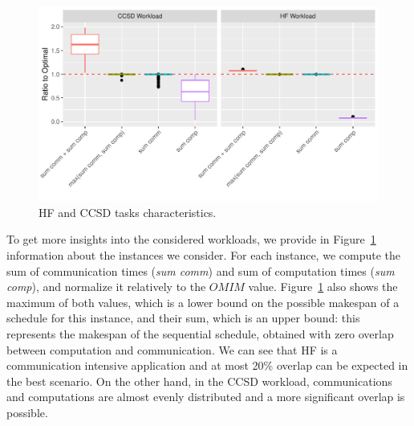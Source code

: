 \documentclass[sigconf]{acmart}
\begin{document}
{		\begin{figure}[htb]
			\includegraphics[scale=0.5]{./results/plots/application_properties.pdf}
			\caption{HF and CCSD tasks characteristics.}
			\label{fig:ApplicationProperties}
		\end{figure}	
		
		
		
		
		To get more insights into the considered workloads, we provide in Figure~\ref{fig:ApplicationProperties} information about
		the instances we consider. For each instance, we compute the sum of communication times (\textit{sum comm}) and sum of computation times  (\textit{sum comp}), and normalize it relatively to the $OMIM$ value. Figure~\ref{fig:ApplicationProperties} also shows the maximum of both values, which is a lower bound on the possible makespan of a schedule for this instance, and their sum, which is an upper bound: this represents the makespan of the sequential schedule, obtained with zero overlap between computation and communication. We can see that HF is a communication intensive application and at most 20\% overlap can be expected in the best scenario. On the other hand, in the CCSD workload, communications and computations are almost evenly distributed and a more significant overlap is possible.
		
}
\end{document}
